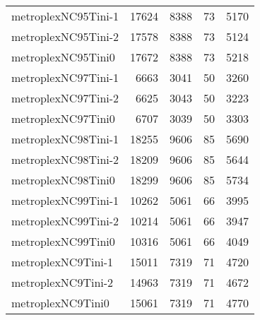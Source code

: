 \begin{longtable}{lrrrr}
metroplexNC95Tini-1 & 17624 & 8388 & 73 & 5170 \\
metroplexNC95Tini-2 & 17578 & 8388 & 73 & 5124 \\
metroplexNC95Tini0 & 17672 & 8388 & 73 & 5218 \\
metroplexNC97Tini-1 & 6663 & 3041 & 50 & 3260 \\
metroplexNC97Tini-2 & 6625 & 3043 & 50 & 3223 \\
metroplexNC97Tini0 & 6707 & 3039 & 50 & 3303 \\
metroplexNC98Tini-1 & 18255 & 9606 & 85 & 5690 \\
metroplexNC98Tini-2 & 18209 & 9606 & 85 & 5644 \\
metroplexNC98Tini0 & 18299 & 9606 & 85 & 5734 \\
metroplexNC99Tini-1 & 10262 & 5061 & 66 & 3995 \\
metroplexNC99Tini-2 & 10214 & 5061 & 66 & 3947 \\
metroplexNC99Tini0 & 10316 & 5061 & 66 & 4049 \\
metroplexNC9Tini-1 & 15011 & 7319 & 71 & 4720 \\
metroplexNC9Tini-2 & 14963 & 7319 & 71 & 4672 \\
metroplexNC9Tini0 & 15061 & 7319 & 71 & 4770 \\
\end{longtable}
